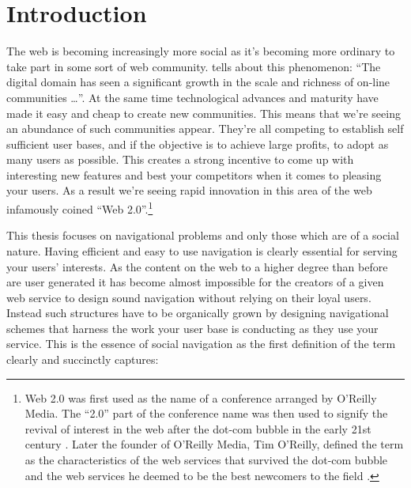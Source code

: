 \chapter{Introduction}

%
%

The web is becoming increasingly more social as it's becoming more ordinary to
take part in some sort of web community. 
\citet[p.~44]{backstrom06} tells about this phenomenon:
``The digital domain has seen a significant growth in the scale and richness
of on-line communities \ldots''. At the same time technological
advances and maturity have made it easy and cheap to create new communities.
This means that we're seeing an abundance of such communities appear.
They're all competing to establish self sufficient user bases, and if the
objective is to achieve large profits, to adopt as many users
as possible. This creates a strong incentive to come up with interesting new
features and best your competitors when it comes to pleasing your users.
As a result we're seeing rapid innovation in this area of the web infamously
coined ``Web 2.0''.\footnote{%
Web 2.0 was first used as the name of a conference arranged by
O'Reilly Media. The ``2.0'' part of the conference name was then used to
signify the revival of interest in the web after the dot-com bubble in the
early 21st century \citep{oreilly07}.
Later the founder of O'Reilly Media, Tim O'Reilly, defined
the term as the characteristics of the web services that survived the dot-com
bubble and the web services he deemed to be the best newcomers to the
field \citep{oreilly05}.}

This thesis focuses on navigational problems and only those which are of a
social nature. Having efficient and easy to use navigation is clearly
essential for serving your users' interests. As the content on the web to a
higher degree than before are user generated it has become almost impossible
for the creators of a given web service to design sound navigation without
relying on their loyal users. Instead such structures have to be organically
grown by designing navigational schemes that harness the work your user base
is conducting as they use your service. This is the essence of social
navigation as the first definition of the term clearly and succinctly
captures:

